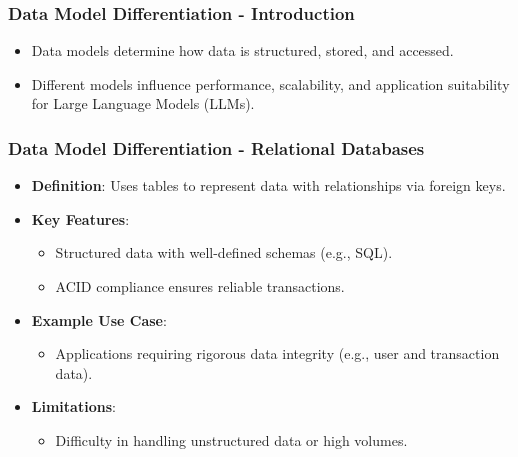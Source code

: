 \documentclass[aspectratio=169]{beamer}
\begin{document}
\begin{frame}[fragile]
    \frametitle{Data Model Differentiation - Introduction}
    \begin{itemize}
        \item Data models determine how data is structured, stored, and accessed.
        \item Different models influence performance, scalability, and application suitability for Large Language Models (LLMs).
    \end{itemize}
\end{frame}

\begin{frame}[fragile]
    \frametitle{Data Model Differentiation - Relational Databases}
    \begin{itemize}
        \item \textbf{Definition}: Uses tables to represent data with relationships via foreign keys.
        \item \textbf{Key Features}:
            \begin{itemize}
                \item Structured data with well-defined schemas (e.g., SQL).
                \item ACID compliance ensures reliable transactions.
            \end{itemize}
        \item \textbf{Example Use Case}: 
            \begin{itemize}
                \item Applications requiring rigorous data integrity (e.g., user and transaction data).
            \end{itemize}
        \item \textbf{Limitations}:
            \begin{itemize}
                \item Difficulty in handling unstructured data or high volumes.
            \end{itemize}
    \end{itemize}
\end{frame}
\end{document}
